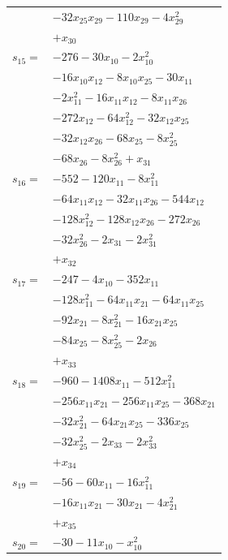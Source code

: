 \begin{longtable}{@{}r@{\;}l@{}}
 & \(\displaystyle -32x_{25}x_{29} -110x_{29} -4x_{29}^{2}\) \\
 & \(\displaystyle +x_{30}\) \\[3pt]
\(s_{15}=\) & \(\displaystyle -276 -30x_{10} -2x_{10}^{2}\) \\
 & \(\displaystyle -16x_{10}x_{12} -8x_{10}x_{25} -30x_{11}\) \\
 & \(\displaystyle -2x_{11}^{2} -16x_{11}x_{12} -8x_{11}x_{26}\) \\
 & \(\displaystyle -272x_{12} -64x_{12}^{2} -32x_{12}x_{25}\) \\
 & \(\displaystyle -32x_{12}x_{26} -68x_{25} -8x_{25}^{2}\) \\
 & \(\displaystyle -68x_{26} -8x_{26}^{2} +x_{31}\) \\[3pt]
\(s_{16}=\) & \(\displaystyle -552 -120x_{11} -8x_{11}^{2}\) \\
 & \(\displaystyle -64x_{11}x_{12} -32x_{11}x_{26} -544x_{12}\) \\
 & \(\displaystyle -128x_{12}^{2} -128x_{12}x_{26} -272x_{26}\) \\
 & \(\displaystyle -32x_{26}^{2} -2x_{31} -2x_{31}^{2}\) \\
 & \(\displaystyle +x_{32}\) \\[3pt]
\(s_{17}=\) & \(\displaystyle -247 -4x_{10} -352x_{11}\) \\
 & \(\displaystyle -128x_{11}^{2} -64x_{11}x_{21} -64x_{11}x_{25}\) \\
 & \(\displaystyle -92x_{21} -8x_{21}^{2} -16x_{21}x_{25}\) \\
 & \(\displaystyle -84x_{25} -8x_{25}^{2} -2x_{26}\) \\
 & \(\displaystyle +x_{33}\) \\[3pt]
\(s_{18}=\) & \(\displaystyle -960 -1408x_{11} -512x_{11}^{2}\) \\
 & \(\displaystyle -256x_{11}x_{21} -256x_{11}x_{25} -368x_{21}\) \\
 & \(\displaystyle -32x_{21}^{2} -64x_{21}x_{25} -336x_{25}\) \\
 & \(\displaystyle -32x_{25}^{2} -2x_{33} -2x_{33}^{2}\) \\
 & \(\displaystyle +x_{34}\) \\[3pt]
\(s_{19}=\) & \(\displaystyle -56 -60x_{11} -16x_{11}^{2}\) \\
 & \(\displaystyle -16x_{11}x_{21} -30x_{21} -4x_{21}^{2}\) \\
 & \(\displaystyle +x_{35}\) \\[3pt]
\(s_{20}=\) & \(\displaystyle -30 -11x_{10} -x_{10}^{2}\) \\

\end{longtable}
